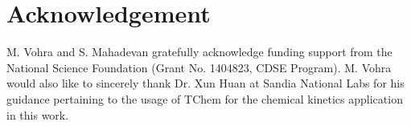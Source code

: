 \section*{Acknowledgement}

M. Vohra and S. Mahadevan gratefully acknowledge funding support from the
National Science Foundation (Grant No. 1404823, CDSE Program). M. Vohra
would also like to sincerely thank Dr. Xun Huan at Sandia National Labs for
his guidance pertaining to the usage of TChem for the chemical kinetics application
in this work. 